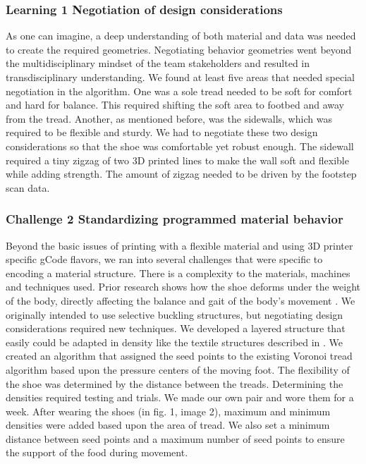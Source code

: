 \subsubsection{Learning 1 Negotiation of design considerations}

As one can imagine, a deep understanding of both material and data was needed to create the required geometries. Negotiating behavior geometries went beyond the multidisciplinary mindset of the team stakeholders and resulted in transdisciplinary understanding. We found at least five areas that needed special negotiation in the algorithm. One was a sole tread needed to be soft for comfort and hard for balance. This required shifting the soft area to footbed and away from the tread. Another, as mentioned before, was the sidewalls, which was required to be flexible and sturdy. We had to negotiate these two design considerations so that the shoe was comfortable yet robust enough. The sidewall required a tiny zigzag of two 3D printed lines to make the wall soft and flexible while adding strength. The amount of zigzag needed to be driven by the footstep scan data. 

\subsubsection{Challenge 2 Standardizing programmed material behavior }

Beyond the basic issues of printing with a flexible material and using 3D printer specific gCode flavors, we ran into several challenges that were specific to encoding a material structure. There is a complexity to the materials, machines and techniques used. Prior research shows how the shoe deforms under the weight of the body, directly affecting the balance and gait of the body's movement \cite{Franklyn-Miller2014}. We originally intended to use selective buckling structures, but negotiating design considerations required new techniques. 
We developed a layered structure that easily could be adapted in density like the textile structures described in \cite{nachtigall2018towards}. We created an algorithm that assigned the seed points to the existing Voronoi tread algorithm based upon the pressure centers of the moving foot. The flexibility of the shoe was determined by the distance between the treads. Determining the densities required testing and trials. We made our own pair and wore them for a week. After wearing the shoes (in fig. 1, image 2), maximum and minimum densities were added based upon the area of tread. We also set a minimum distance between seed points and a maximum number of seed points to ensure the support of the food during movement.


